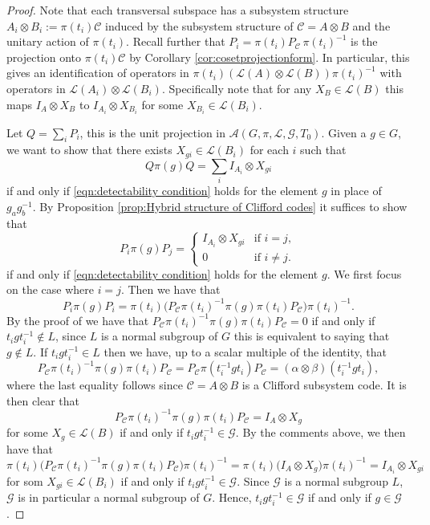 \documentclass[11pt]{article}
\theoremstyle{definition}
\newcommand{\calC}{\mathcal{C}}
\newcommand{\calG}{\mathcal{G}}
\newcommand{\calL}{\mathcal{L}}
\begin{document}
\begin{proof}
    Note that each transversal subspace has a subsystem structure $A_i \otimes B_i := \pi(t_i) \mathcal C$ induced by the subsystem structure of $\mathcal C = A \otimes B$ and the unitary action of $\pi(t_i)$. Recall further that $P_i = \pi(t_i) P_{\mathcal C} \,\pi(t_i)^{-1}$ is the projection onto $\pi(t_i) \mathcal C$ by Corollary \ref{cor:cosetprojectionform}. In particular, this gives an identification of operators in $\pi(t_i) (\mathcal L(A)\otimes \mathcal L(B)) \pi(t_i)^{-1}$ with operators in $\mathcal L(A_i)\otimes \mathcal L(B_i)$. Specifically note that for any $X_B \in \mathcal L(B)$ this maps $I_A \otimes X_B$ to $I_{A_i}\otimes X_{B_i}$ for some $X_{B_i}\in \mathcal L(B_i)$.
    
    Let $Q = \sum_i P_i$, this is the unit projection in $\mathcal A (G,\pi,\calL,\calG,T_0)$. Given a $g \in G$, we want to show that there exists $X_{gi} \in \calL(B_i)$ for each $i$ such that
    \[
        Q\pi(g)Q = \sum_i I_{A_i} \otimes X_{gi}
    \]
    if and only if \eqref{eqn:detectability condition} holds for the element $g$ in place of $g_ag_b^{-1}$. By Proposition \ref{prop:Hybrid structure of Clifford codes} it suffices to show that
    \[
        P_i \pi(g) P_j =
        \begin{cases}
            I_{A_i} \otimes X_{gi} & \text{if } i = j, \\
            0 & \text{if } i \neq j.
        \end{cases}
    \]
    if and only if \eqref{eqn:detectability condition} holds for the element $g$. We first focus on the case where $i = j$. Then we have that
    \[
        P_i \pi(g) P_i
        = \pi(t_i) \big( P_\calC \pi(t_i)^{-1} \pi(g) \pi(t_i) P_\calC \big) \pi(t_i)^{-1}.
    \]
    By the proof of \cite[Theorem 6.3]{Eidesen2025} we have that $P_\calC \pi(t_i)^{-1} \pi(g) \pi(t_i) P_\calC = 0$ if and only if $t_igt_i^{-1} \not\in L$, since $L$ is a normal subgroup of $G$ this is equivalent to saying that $g \not\in L$. If $t_igt_i^{-1} \in L$ then we have, up to a scalar multiple of the identity, that
    \[
        P_\calC \pi(t_i)^{-1} \pi(g) \pi(t_i) P_\calC
        = P_\calC \pi(t_i^{-1}gt_i) P_\calC
        = (\alpha \otimes \beta)(t_i^{-1}gt_i),
    \]
    where the last equality follows since $\calC = A \otimes B$ is a Clifford subsystem code. It is then clear that 
    \[
        P_\calC \pi(t_i)^{-1} \pi(g) \pi(t_i) P_\calC = I_A \otimes X_g
    \]
    for some $X_g \in \calL(B)$ if and only if $t_igt_i^{-1} \in \calG$. By the comments above, we then have that
    \[
        \pi(t_i) \big( P_\calC \pi(t_i)^{-1} \pi(g) \pi(t_i) P_\calC \big) \pi(t_i)^{-1}
        = \pi(t_i) \big( I_A \otimes X_g \big) \pi(t_i)^{-1}
        = I_{A_i} \otimes X_{gi}
    \]
    for som $X_{gi} \in \calL(B_i)$ if and only if $t_igt_i^{-1} \in \calG$. Since $\calG$ is a normal subgroup $L$, $\calG$ is in particular a normal subgroup of $G$. Hence, $t_igt_i^{-1} \in \calG$ if and only if $g \in \calG$.


\end{proof}
\end{document}
